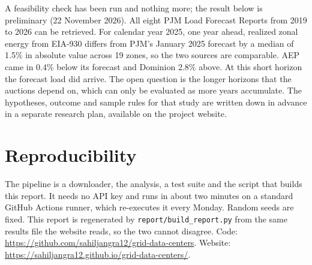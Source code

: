\documentclass[11pt,a4paper]{article}
\begin{document}
A feasibility check has been run and nothing more; the result below is preliminary (22 November 2026). All eight PJM Load Forecast Reports from 2019 to 2026 can be retrieved. For calendar year 2025, one year ahead, realized zonal energy from EIA-930 differs from PJM's January 2025 forecast by a median of 1.5\% in absolute value across 19 zones, so the two sources are comparable. AEP came in 0.4\% below its forecast and Dominion 2.8\% above. At this short horizon the forecast load did arrive. The open question is the longer horizons that the auctions depend on, which can only be evaluated as more years accumulate. The hypotheses, outcome and sample rules for that study are written down in advance in a separate research plan, available on the project website.

\section{Reproducibility}\label{sec:repro}
The pipeline is a downloader, the analysis, a test suite and the script that builds this report. It needs no API key and runs in about two minutes on a standard GitHub Actions runner, which re-executes it every Monday. Random seeds are fixed. This report is regenerated by \texttt{report/build\_report.py} from the same results file the website reads, so the two cannot disagree. Code: \url{https://github.com/sahiljangra12/grid-data-centers}. Website: \url{https://sahiljangra12.github.io/grid-data-centers/}.
\end{document}
